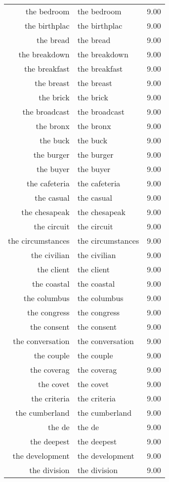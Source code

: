 \begin{table}[ht]
\begin{tabular}{rlr}
  the bedroom & the bedroom & 9.00 \\ 
  the birthplac & the birthplac & 9.00 \\ 
  the bread & the bread & 9.00 \\ 
  the breakdown & the breakdown & 9.00 \\ 
  the breakfast & the breakfast & 9.00 \\ 
  the breast & the breast & 9.00 \\ 
  the brick & the brick & 9.00 \\ 
  the broadcast & the broadcast & 9.00 \\ 
  the bronx & the bronx & 9.00 \\ 
  the buck & the buck & 9.00 \\ 
  the burger & the burger & 9.00 \\ 
  the buyer & the buyer & 9.00 \\ 
  the cafeteria & the cafeteria & 9.00 \\ 
  the casual & the casual & 9.00 \\ 
  the chesapeak & the chesapeak & 9.00 \\ 
  the circuit & the circuit & 9.00 \\ 
  the circumstances & the circumstances & 9.00 \\ 
  the civilian & the civilian & 9.00 \\ 
  the client & the client & 9.00 \\ 
  the coastal & the coastal & 9.00 \\ 
  the columbus & the columbus & 9.00 \\ 
  the congress & the congress & 9.00 \\ 
  the consent & the consent & 9.00 \\ 
  the conversation & the conversation & 9.00 \\ 
  the couple & the couple & 9.00 \\ 
  the coverag & the coverag & 9.00 \\ 
  the covet & the covet & 9.00 \\ 
  the criteria & the criteria & 9.00 \\ 
  the cumberland & the cumberland & 9.00 \\ 
  the de & the de & 9.00 \\ 
  the deepest & the deepest & 9.00 \\ 
  the development & the development & 9.00 \\ 
  the division & the division & 9.00 \\ 

\end{tabular}
\end{table}
